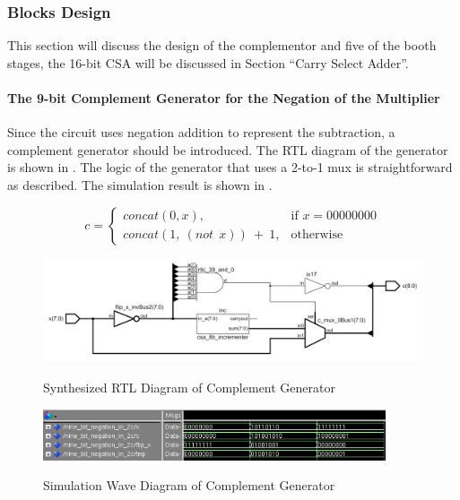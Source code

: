 \subsubsection{Blocks Design}

This section will discuss the design of the complementor and five of the booth stages,
the 16-bit CSA will be discussed in Section “Carry Select Adder”.

\paragraph{The 9-bit Complement Generator for the Negation of the Multiplier}
Since the circuit uses negation addition to represent the subtraction, a complement generator should be introduced.
The RTL diagram of the generator is shown in .
The logic of the generator that uses a 2-to-1 mux is straightforward as  described.
The simulation result is shown in .

\begin{equation}
	c =
	\begin{cases}
		concat(0, x),                 & \text{if } x = 00000000 \\
		concat(1,\ (not\ \ x))\ +\ 1, & \text{otherwise}
	\end{cases}
	\label{exp:complementor_exp}
\end{equation}

\begin{figure}[!ht]
	\centering
	\caption{Synthesized RTL Diagram of Complement Generator}
	\includegraphics[width=\textwidth]{../img/complementor_rtl.png}
	\label{fig:complementor_rtl}
\end{figure}

\begin{figure}[!ht]
	\centering
	\caption{Simulation Wave Diagram of Complement Generator}
	\includegraphics[width=0.9\textwidth]{../img/complementor_sim.png}
	\label{fig:complementor_sim}
\end{figure}

